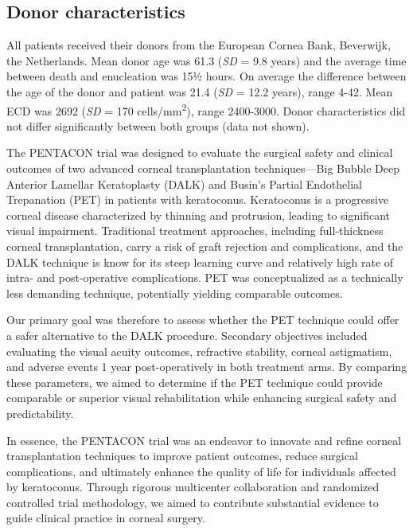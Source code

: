 \documentclass[authordate, empirical]{jote-new-article}
\begin{document}
	\subsection{Donor characteristics}



	All patients received their donors from the European Cornea Bank, Beverwijk, the Netherlands. Mean donor age was 61.3 (\emph{SD }=\emph{ }9.8 years) and the average time between death and enucleation was 15½ hours. On average the difference between the age of the donor and patient was 21.4 (\emph{SD }=\emph{ }12.2 years), range 4-42. Mean ECD was 2692 (\emph{SD }=\emph{ }170 cells/mm\textsuperscript{2}), range 2400-3000. Donor characteristics did not differ significantly between both groups (data not shown).

	
	
	\begin{originalPurpose}
		The PENTACON trial was designed to evaluate the surgical safety and clinical outcomes of two advanced corneal transplantation techniques—Big Bubble Deep Anterior Lamellar Keratoplasty (DALK) and Busin's Partial Endothelial Trepanation (PET) in patients with keratoconus. Keratoconus is a progressive corneal disease characterized by thinning and protrusion, leading to significant visual impairment. Traditional treatment approaches, including full-thickness corneal transplantation, carry a risk of graft rejection and complications, and the DALK technique is know for its steep learning curve and relatively high rate of intra- and post-operative complications. PET was conceptualized as a technically less demanding technique, potentially yielding comparable outcomes.
	
		Our primary goal was therefore to assess whether the PET technique could offer a safer alternative to the DALK procedure. Secondary objectives included evaluating the visual acuity outcomes, refractive stability, corneal astigmatism, and adverse events 1 year post-operatively in both treatment arms. By comparing these parameters, we aimed to determine if the PET technique could provide comparable or superior visual rehabilitation while enhancing surgical safety and predictability.

		In essence, the PENTACON trial was an endeavor to innovate and refine corneal transplantation techniques to improve patient outcomes, reduce surgical complications, and ultimately enhance the quality of life for individuals affected by keratoconus. Through rigorous multicenter collaboration and randomized controlled trial methodology, we aimed to contribute substantial evidence to guide clinical practice in corneal surgery.
	\end{originalPurpose}
\end{document}
